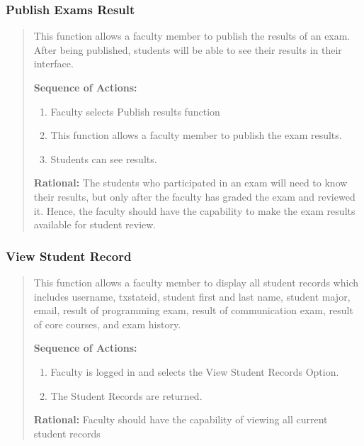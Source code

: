    \subsubsection{Publish Exams Result}
   \begin{quote} %
         This function allows a faculty member to publish the results of an
         exam. After being published, students will be able to see their
         results in their interface.
         
         \textbf{Sequence of Actions:}
         \begin{enumerate}
            \item Faculty selects Publish results function
            \item This function allows a faculty member to publish the exam results.
            \item Students can see results.
      \end{enumerate}

         \textbf{Rational:}
         The students who participated in an exam will need to know their
         results, but only after the faculty has graded the exam and reviewed
         it. Hence, the faculty should have the capability to make the exam
         results available for student review.
   \end{quote} %

   \subsubsection{View Student Record}
   \begin{quote} %
         This function allows a faculty member to display all student records
         which includes username, txstateid, student first and last name,
         student major, email, result of programming exam, result of
         communication exam, result of core courses, and exam history.
         
         \textbf{Sequence of Actions:}
         \begin{enumerate}
            \item Faculty is logged in and selects the View Student Records Option.
            \item The Student Records are returned.
      \end{enumerate}

         \textbf{Rational:}
         Faculty should have the capability of viewing all current student
         records
   \end{quote} %


